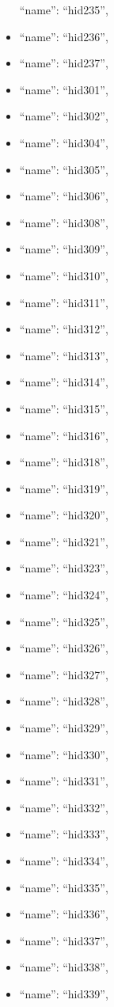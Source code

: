 \begin{itemize}
  ``name'': ``hid235'',
\item
  ``name'': ``hid236'',
\item
  ``name'': ``hid237'',
\item
  ``name'': ``hid301'',
\item
  ``name'': ``hid302'',
\item
  ``name'': ``hid304'',
\item
  ``name'': ``hid305'',
\item
  ``name'': ``hid306'',
\item
  ``name'': ``hid308'',
\item
  ``name'': ``hid309'',
\item
  ``name'': ``hid310'',
\item
  ``name'': ``hid311'',
\item
  ``name'': ``hid312'',
\item
  ``name'': ``hid313'',
\item
  ``name'': ``hid314'',
\item
  ``name'': ``hid315'',
\item
  ``name'': ``hid316'',
\item
  ``name'': ``hid318'',
\item
  ``name'': ``hid319'',
\item
  ``name'': ``hid320'',
\item
  ``name'': ``hid321'',
\item
  ``name'': ``hid323'',
\item
  ``name'': ``hid324'',
\item
  ``name'': ``hid325'',
\item
  ``name'': ``hid326'',
\item
  ``name'': ``hid327'',
\item
  ``name'': ``hid328'',
\item
  ``name'': ``hid329'',
\item
  ``name'': ``hid330'',
\item
  ``name'': ``hid331'',
\item
  ``name'': ``hid332'',
\item
  ``name'': ``hid333'',
\item
  ``name'': ``hid334'',
\item
  ``name'': ``hid335'',
\item
  ``name'': ``hid336'',
\item
  ``name'': ``hid337'',
\item
  ``name'': ``hid338'',
\item
  ``name'': ``hid339'',

\end{itemize}

